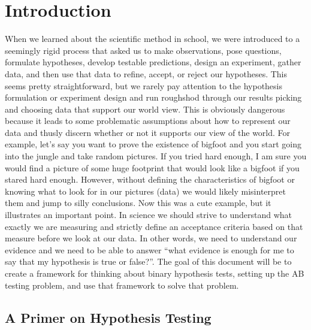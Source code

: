 
\section{Introduction\label{sec:Intro}}

When we learned about the scientific method in school, we were introduced to a seemingly rigid process that 
asked us to make observations, pose questions, formulate hypotheses, develop testable predictions, design an 
experiment, gather data, and then use that data to refine, accept, or reject our hypotheses. This seems pretty 
straightforward, but we rarely pay attention to the hypothesis formulation or experiment design and run 
roughshod through our results picking and choosing data that support our world view. This is obviously 
dangerous because it leads to some problematic assumptions about how to represent our data and thusly discern 
whether or not it supports our view of the world. For example, let’s say you want to prove the existence of 
bigfoot and you start going into the jungle and take random pictures. If you tried hard enough, I am sure you 
would find a picture of some huge footprint that would look like a bigfoot if you stared hard enough. However, 
without defining the characteristics of bigfoot or knowing what to look for in our pictures (data) we would 
likely misinterpret them and jump to silly conclusions. Now this was a cute example, but it illustrates an 
important point. In science we should strive to understand what exactly we are measuring and strictly 
define an acceptance criteria based on that measure before we look at our data. In other words, we need 
to understand our evidence and we need to be able to answer “what evidence is enough for me to say that my 
hypothesis is true or false?”. The goal of this document will be to create a framework for thinking about 
binary hypothesis tests, setting up the AB testing problem, and use that framework to solve that problem.


\subsection{A Primer on Hypothesis Testing}

